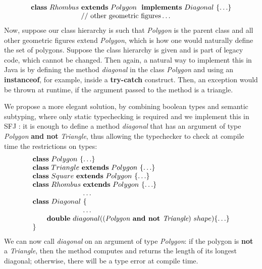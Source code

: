 \documentclass[runningheads]{llncs}
\begin{document}
\begin{example}[Polygons]
\begin{equation*}
\begin{array}{l}
            \mathbf{class} \  Rhombus \ \mathbf{extends }\  Polygon\  \ \mathbf{implements}\  Diagonal \ \{\ldots\}
            \\
            \hspace{2.5cm} // \text{ other geometric figures} \ldots
        \end{array}
    \end{equation*}
    Now, suppose our class hierarchy is such that \emph{Polygon} is the parent class and all other geometric figures extend \emph{Polygon}, which is how one would naturally define the set of polygons.
    Suppose the class hierarchy is given and is part of legacy code, which cannot be changed.
    Then again, a natural way to implement this in Java is by defining the method \emph{diagonal} in the class \emph{Polygon} and using an \textbf{instanceof}, for example, inside a \textbf{try-catch} construct.
    Then, an exception would be thrown at runtime, if the argument passed to the method is a triangle.

    We propose a more elegant solution, by combining boolean types and semantic subtyping, where only static typechecking is required and we implement this in SFJ \cite{UD20}: it is enough to define a method \emph{diagonal} that has an argument of type \emph{Polygon} \textbf{and not} \emph{Triangle}, thus allowing the typechecker to check at compile time the restrictions on types:
    \begin{equation*}
        \begin{array}{l}
            \mathbf{class} \  Polygon \ \{\ldots\}
            \\
            \mathbf{class} \  Triangle \ \mathbf{extends }\  Polygon\ \{\ldots\}
            \\
            \mathbf{class} \  Square \ \mathbf{extends }\  Polygon\ \{\ldots\}
            \\
            \mathbf{class} \  Rhombus \ \mathbf{extends }\  Polygon\ \{\ldots\}
            \\
            \hspace{2.5cm} \ldots
            \\
            \mathbf{class} \  Diagonal \ \{
            \\
            \hspace{2.5cm} \ldots \\
            \qquad \mathbf{double}\ diagonal((\textit{Polygon} \textbf{ and not }  \textit{Triangle}) \ shape)\{\ldots\}
            \\
            \}
        \end{array}
    \end{equation*}
    We can now call \emph{diagonal} on an argument of type \emph{Polygon}: if the polygon is \textbf{not} a \emph{Triangle}, then the method computes and returns the length of its longest diagonal; otherwise, there will be a type error at compile time.
\end{example}
\end{document}
